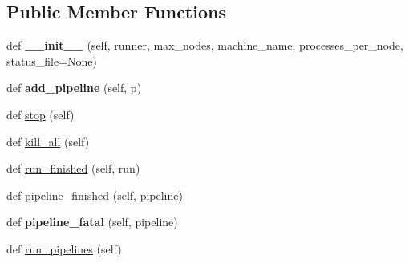 \subsection*{Public Member Functions}
\begin{DoxyCompactItemize}
\item 
\mbox{\label{classcodar_1_1savanna_1_1consumer_1_1_pipeline_runner_acf72709f2d294ec9c1136d7ef72d06e4}} 
def {\bfseries \+\_\+\+\_\+init\+\_\+\+\_\+} (self, runner, max\+\_\+nodes, machine\+\_\+name, processes\+\_\+per\+\_\+node, status\+\_\+file=None)
\item 
\mbox{\label{classcodar_1_1savanna_1_1consumer_1_1_pipeline_runner_a861447c8086329814e32c709a713f624}} 
def {\bfseries add\+\_\+pipeline} (self, p)
\item 
def \hyperlink{classcodar_1_1savanna_1_1consumer_1_1_pipeline_runner_a62bc31b0b57c9062d05fac14fb50b9b4}{stop} (self)
\item 
def \hyperlink{classcodar_1_1savanna_1_1consumer_1_1_pipeline_runner_a5d7432a5e1b57fa669dbc7391de3c881}{kill\+\_\+all} (self)
\item 
def \hyperlink{classcodar_1_1savanna_1_1consumer_1_1_pipeline_runner_a059b4a5e2c63e6e893a2f1c7862967b3}{run\+\_\+finished} (self, run)
\item 
def \hyperlink{classcodar_1_1savanna_1_1consumer_1_1_pipeline_runner_a4fd8b1e73906734e53fe137f6d808be3}{pipeline\+\_\+finished} (self, pipeline)
\item 
\mbox{\label{classcodar_1_1savanna_1_1consumer_1_1_pipeline_runner_ad8891e29ad84031b9b162b2a7cef918e}} 
def {\bfseries pipeline\+\_\+fatal} (self, pipeline)
\item 
def \hyperlink{classcodar_1_1savanna_1_1consumer_1_1_pipeline_runner_af1fe6b71b44a5e849052a36643444db3}{run\+\_\+pipelines} (self)
\end{DoxyCompactItemize}
